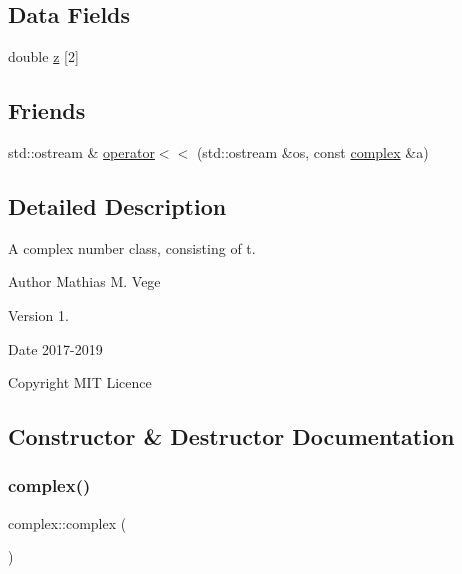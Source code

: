 \subsection*{Data Fields}
\begin{DoxyCompactItemize}
\item 
double \mbox{\hyperlink{classcomplex_a24187dbb902b927fe283d138188ec6fe}{z}} \mbox{[}2\mbox{]}
\end{DoxyCompactItemize}
\subsection*{Friends}
\begin{DoxyCompactItemize}
\item 
std\+::ostream \& \mbox{\hyperlink{classcomplex_aad6a59c1e6f7a869a693e1eba8b2604d}{operator$<$$<$}} (std\+::ostream \&os, const \mbox{\hyperlink{classcomplex}{complex}} \&a)
\end{DoxyCompactItemize}


\subsection{Detailed Description}
A complex number class, consisting of t. 

\begin{DoxyAuthor}{Author}
Mathias M. Vege 
\end{DoxyAuthor}
\begin{DoxyVersion}{Version}
1. 
\end{DoxyVersion}
\begin{DoxyDate}{Date}
2017-\/2019 
\end{DoxyDate}
\begin{DoxyCopyright}{Copyright}
M\+IT Licence 
\end{DoxyCopyright}


\subsection{Constructor \& Destructor Documentation}
\mbox{\label{classcomplex_a1fb8d3affbc54c1ad34a0820b357e194}} 
\subsubsection{\texorpdfstring{complex()}{complex()}\hspace{0.1cm}{\footnotesize\ttfamily [1/3]}}
{\footnotesize\ttfamily complex\+::complex (\begin{DoxyParamCaption}{ }\end{DoxyParamCaption})}

